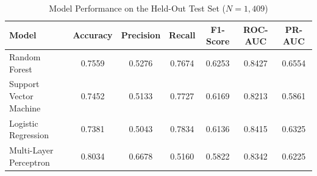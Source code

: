 \begin{table}[H]
\centering
\caption{Model Performance on the Held-Out Test Set ($N=1,409$)}
\label{tab:model_comparison}
\begin{tabular}{lcccccc}
\toprule
\textbf{Model} & \textbf{Accuracy} & \textbf{Precision} & \textbf{Recall} & \textbf{F1-Score} & \textbf{ROC-AUC} & \textbf{PR-AUC} \\
\midrule
Random Forest & 0.7559 & 0.5276 & 0.7674 & 0.6253 & 0.8427 & 0.6554 \\
Support Vector Machine & 0.7452 & 0.5133 & 0.7727 & 0.6169 & 0.8213 & 0.5861 \\
Logistic Regression & 0.7381 & 0.5043 & 0.7834 & 0.6136 & 0.8415 & 0.6325 \\
Multi-Layer Perceptron & 0.8034 & 0.6678 & 0.5160 & 0.5822 & 0.8342 & 0.6225 \\
\bottomrule
\end{tabular}
\end{table}